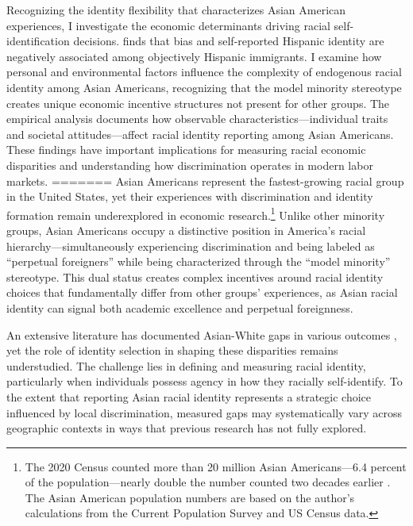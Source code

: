 Recognizing the identity flexibility that characterizes Asian American experiences, I investigate the economic determinants driving racial self-identification decisions. \textcite{hadah2024hispanicidentity} finds that bias and self-reported Hispanic identity are negatively associated among objectively Hispanic immigrants. I examine how personal and environmental factors influence the complexity of endogenous racial identity among Asian Americans, recognizing that the model minority stereotype creates unique economic incentive structures not present for other groups. The empirical analysis documents how observable characteristics---individual traits and societal attitudes---affect racial identity reporting among Asian Americans. These findings have important implications for measuring racial economic disparities and understanding how discrimination operates in modern labor markets.
=======
Asian Americans represent the fastest-growing racial group in the United States, yet their experiences with discrimination and identity formation remain underexplored in economic research.\footnote{The 2020 Census counted more than 20 million Asian Americans---6.4 percent of the population---nearly double the number counted two decades earlier \autocite{floodsarahIntegratedPublicUse2021a}. The Asian American population numbers are based on the author's calculations from the Current Population Survey and US Census data.} Unlike other minority groups, Asian Americans occupy a distinctive position in America's racial hierarchy—simultaneously experiencing discrimination and being labeled as ``perpetual foreigners'' while being characterized through the ``model minority'' stereotype. This dual status creates complex incentives around racial identity choices that fundamentally differ from other groups' experiences, as Asian racial identity can signal both academic excellence and perpetual foreignness.

An extensive literature has documented Asian-White gaps in various outcomes \autocite{chiswick1983analysis, duleep2012economic, hilger2016upward, arabsheibani2010asian}, yet the role of identity selection in shaping these disparities remains understudied. The challenge lies in defining and measuring racial identity, particularly when individuals possess agency in how they racially self-identify. To the extent that reporting Asian racial identity represents a strategic choice influenced by local discrimination, measured gaps may systematically vary across geographic contexts in ways that previous research has not fully explored.

